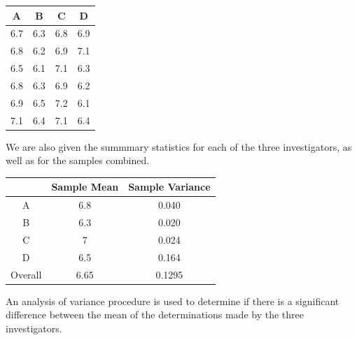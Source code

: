 \documentclass[a4paper,12pt]{article}
\begin{document}
	
	\begin{center}
		\begin{tabular}{|c|c|c|c|} \hline
			A  &  B   & C &D\\ \hline \hline
			6.7 & 6.3 & 6.8 & 6.9\\ \hline
			6.8 & 6.2 & 6.9 & 7.1\\ \hline
			6.5 & 6.1 & 7.1 &6.3 \\ \hline
			6.8 & 6.3 & 6.9 &6.2\\ \hline
			6.9 & 6.5 & 7.2 & 6.1\\ \hline
			7.1 & 6.4 & 7.1 & 6.4\\ \hline
		\end{tabular} 
	\end{center}
	
	
	
	\noindent We are also given the summmary statistics for each of the three investigators, as well as for the samples combined.
	\begin{center}
		\begin{tabular}{|c|c|c|}
			\hline  & Sample Mean & Sample Variance \\ 
			\hline A & 6.8 & 0.040 \\ 
			\hline B & 6.3 & 0.020 \\ 
			\hline C & 7 & 0.024 \\ 
			\hline D & 6.5 &  0.164\\
			\hline Overall & 6.65 & 0.1295 \\ 
			\hline 
		\end{tabular} 
	\end{center}
	\noindent An analysis of variance procedure is used to determine if there is a significant difference between the mean of the determinations made by the three investigators.
	
	
	
	\smallskip
	
\end{document}
